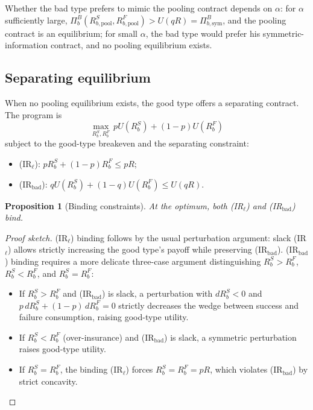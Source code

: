 \documentclass[11pt,a4paper,oneside]{book}
\def\leq{\leqslant}
\theoremstyle{plain}
\newtheorem{proposition}[theorem]{Proposition}
\theoremstyle{definition}
\theoremstyle{remark}
\numberwithin{equation}{chapter}
\begin{document}
Whether the bad type prefers to mimic the pooling contract depends on $\alpha$: for $\alpha$ sufficiently large, $\Pi_b^{B}(R_{b, \text{pool}}^S, R_{b, \text{pool}}^F) > U(qR) = \Pi_{b, \text{sym}}^{B}$, and the pooling contract is an equilibrium; for small $\alpha$, the bad type would prefer his symmetric-information contract, and no pooling equilibrium exists.

\subsection{Separating equilibrium}

When no pooling equilibrium exists, the good type offers a separating contract.
The program is
\begin{equation*}
  \max_{R_b^S, R_b^F} \, p U(R_b^S) + (1 - p) U(R_b^F)
\end{equation*}
subject to the good-type breakeven and the separating constraint:
\begin{itemize}
  \item (IR$_\ell$): $p R_b^S + (1 - p) R_b^F \leq pR$;
  \item (IR$_{\text{bad}}$): $q U(R_b^S) + (1 - q) U(R_b^F) \leq U(qR)$.
\end{itemize}

\begin{proposition}[Binding constraints]\label{prop:diss-divers-binding}
At the optimum, both (IR$_\ell$) and (IR$_{\text{bad}}$) bind.
\end{proposition}

\begin{proof}[Proof sketch]
(IR$_\ell$) binding follows by the usual perturbation argument: slack (IR$_\ell$) allows strictly increasing the good type's payoff while preserving (IR$_{\text{bad}}$).
(IR$_{\text{bad}}$) binding requires a more delicate three-case argument distinguishing $R_b^S > R_b^F$, $R_b^S < R_b^F$, and $R_b^S = R_b^F$:
\begin{itemize}
  \item If $R_b^S > R_b^F$ and (IR$_{\text{bad}}$) is slack, a perturbation with $dR_b^S < 0$ and $p \, dR_b^S + (1-p) \, dR_b^F = 0$ strictly decreases the wedge between success and failure consumption, raising good-type utility.
  \item If $R_b^S < R_b^F$ (over-insurance) and (IR$_{\text{bad}}$) is slack, a symmetric perturbation raises good-type utility.
  \item If $R_b^S = R_b^F$, the binding (IR$_\ell$) forces $R_b^S = R_b^F = pR$, which violates (IR$_{\text{bad}}$) by strict concavity.
\end{itemize}
\end{proof}
\end{document}

